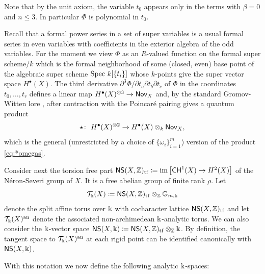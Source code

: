 \documentclass[twoside,leqno]{article}
\numberwithin{equation}{section}
\theoremstyle{plain}
\theoremstyle{definition}
\begin{document}
Note that by the unit axiom, the variable $t_0$ appears only in the terms with $\beta=0$ and $n \le 3$. In particular $\Phi$ is polynomial in $t_{0}$. 

Recall that a formal power series in a set of super variables is a usual formal series in even variables with coefficients in the exterior algebra of the odd variables. For the moment we  view $\Phi$ as an $R$-valued function on the formal super scheme/$k$ which is the formal neighborhood of some (closed, even) base point  of the algebraic super scheme 
$\operatorname{Spec} \, k[\{t_{i}\}]$ whose $k$-points give the super vector space $H^{\bullet}(X)$.  
The third derivative $\partial^3\Phi/\partial t_{a}\partial t_{b}\partial t_{c}$ of $\Phi$ in the coordinates $t_{0}, \ldots, t_{r}$
defines a linear map $H^{\bullet}(X)^{\otimes 3} \to \mathsf{Nov}_{X}$ and, by the standard Gromov-Witten lore \cite{Kontsevich_Gromov-Witten_classes},
after contraction with the Poincar\'{e} pairing gives a quantum product 
\[
\star \colon \ H^{\bullet}(X)^{\otimes 2} \to 
H^{\bullet}(X)\otimes_{k} \mathsf{Nov}_{X},
\]
which is the general (unrestricted by a choice of $\{\omega_{i}\}_{i = 1}^{m}$) version of the  product \eqref{eq:*omegas}. 

\medskip

Consider next the torsion free part $\mathsf{NS}(X,\mathbb Z)_{\operatorname{tf}} \coloneqq 
\operatorname{im}\left[\mathsf{CH}^{1}(X) \to H^2(X)\right]$ of the N\'{e}ron-Severi group of $X$. It is a free abelian group of finite rank $\rho$. Let
\[
\mathcal{T}_{\Bbbk}(X) \coloneqq \mathsf{NS}(X,\mathbb Z)_{\operatorname{tf}}\otimes_{\mathbb Z} \mathbb{G}_{m,\Bbbk}
\]
denote the
split affine torus over $\Bbbk$ with cocharacter lattice $\mathsf{NS}(X,\mathbb Z)_{\operatorname{tf}}$ and let 
$\mathcal{T}_{\Bbbk}(X)^{\operatorname{an}}$ denote the associated non-archimedean $\Bbbk$-analytic torus. We can also consider the $\Bbbk$-vector space 
$\mathsf{NS}(X,\Bbbk) \coloneqq \mathsf{NS}(X,\mathbb Z)_{\operatorname{tf}}\otimes_{\mathbb Z} \Bbbk$. By definition, the tangent space to $\mathcal{T}_{\Bbbk}(X)^{\operatorname{an}}$ at each rigid point can be identified canonically with $\mathsf{NS}(X,\Bbbk)$.

\medskip

With this notation we now define the following analytic $\Bbbk$-spaces:
\end{document}
